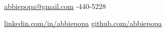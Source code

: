 \documentclass[line,margin,10pt]{res}
\begin{document}
 
\begin{resume}
\hoffset\centerline 
{\hyperref[abbiepopa@gmail.com]{abbiepopa@gmail.com} \quad \quad \quad \quad  \quad \quad \quad \quad \quad \quad \quad \quad \quad \quad \quad \quad \quad \quad \quad \quad \quad\quad \quad \quad \quad \quad \quad \quad \quad \quad \quad \quad  \quad \quad {}-440-5228}
\hoffset\centerline 
{\hspace{0.05cm} \hyperref[linkedin.com/in/abbiepopa]{linkedin.com/in/abbiepopa} \quad \quad \quad \quad \quad \quad \quad \quad \quad \quad \quad\quad \quad \quad \quad \quad \quad \quad \quad \quad \quad \quad  \quad \quad \quad  \quad \quad \quad   \quad \hyperref[github.com/abbiepopa]{github.com/abbiepopa}}
 
{\vspace{-0.25cm}}


\end{resume}
\end{document}
